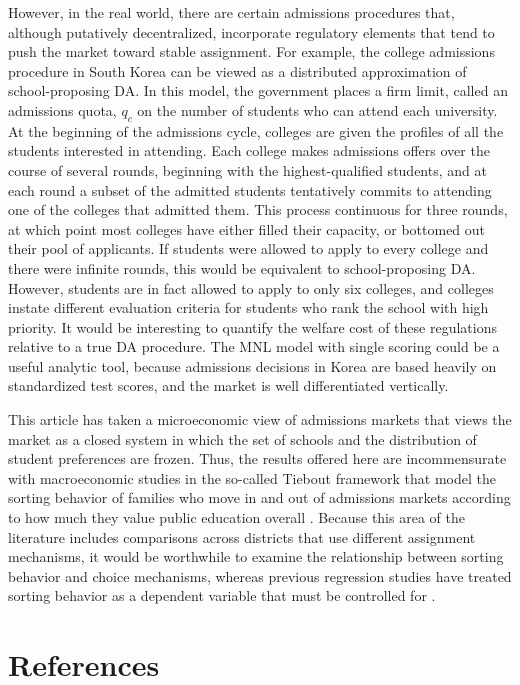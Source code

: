 \documentclass[12pt]{article}
\theoremstyle{definition}
\begin{document}
However, in the real world, there are certain admissions procedures that, although putatively decentralized, incorporate regulatory elements that tend to push the market toward stable assignment. For example, the college admissions procedure in South Korea can be viewed as a distributed approximation of school-proposing DA. In this model, the government places a firm limit, called an admissions quota, $q_c$ on the number of students who can attend each university. At the beginning of the admissions cycle, colleges are given the profiles of all the students interested in attending. Each college makes admissions offers over the course of several rounds, beginning with the highest-qualified students, and at each round a subset of the admitted students tentatively commits to attending one of the colleges that admitted them. This process continuous for three rounds, at which point most colleges have either filled their capacity, or bottomed out their pool of applicants. If students were allowed to apply to every college and there were infinite rounds, this would be equivalent to school-proposing DA. However, students are in fact allowed to apply to only six colleges, and colleges instate different evaluation criteria for students who rank the school with high priority. It would be interesting to quantify the welfare cost of these regulations relative to a true DA procedure. The MNL model with single scoring could be a useful analytic tool, because admissions decisions in Korea are based heavily on standardized test scores, and the market is well differentiated vertically.

This article has taken a microeconomic view of admissions markets that views the market as a closed system in which the set of schools and the distribution of student preferences are frozen. Thus, the results offered here are incommensurate with macroeconomic studies in the so-called Tiebout framework that model the sorting behavior of families who move in and out of admissions markets according to how much they value public education overall \parencite[][]{apuretheoryoflocalexpenditures, equilibriumandlocalredistribution}. Because this area of the literature includes comparisons across districts that use different assignment mechanisms, it would be worthwhile to examine the relationship between sorting behavior and choice mechanisms, whereas previous regression studies have treated sorting behavior as a dependent variable that must be controlled for \parencite[][]{doescompetitionamongpublicschools}.

\pagebreak
\section{References}
\printbibliography[heading=none]
\end{document}
